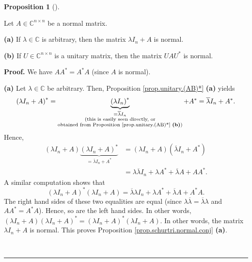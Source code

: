 \documentclass[numbers=enddot,12pt,final,onecolumn,notitlepage]{scrartcl}%
\numberwithin{exer}{subsection}
\theoremstyle{definition}
\newtheorem{prop}[theo]{Proposition}
\newenvironment{proposition}[1][]
{\begin{prop}[#1]\begin{leftbar}}
{\end{leftbar}\end{prop}}
\newenvironment{proof}[1][Proof]{\noindent\textbf{#1.} }{\ \rule{0.5em}{0.5em}}
\begin{document}
\begin{proposition}
\label{prop.schurtri.normal.conj}Let $A\in\mathbb{C}^{n\times n}$ be a normal matrix.

\textbf{(a)} If $\lambda\in\mathbb{C}$ is arbitrary, then the matrix $\lambda
I_{n}+A$ is normal.

\textbf{(b)} If $U\in\mathbb{C}^{n\times n}$ is a unitary matrix, then the
matrix $UAU^{\ast}$ is normal.
\end{proposition}

\begin{proof}
We have $AA^{\ast}=A^{\ast}A$ (since $A$ is normal).

\textbf{(a)} Let $\lambda\in\mathbb{C}$ be arbitrary. Then, Proposition
\ref{prop.unitary.(AB)*} \textbf{(a)} yields%
\[
\left(  \lambda I_{n}+A\right)  ^{\ast}=\underbrace{\left(  \lambda
I_{n}\right)  ^{\ast}}_{\substack{=\overline{\lambda}I_{n}\\\text{(this is
easily seen directly, or}\\\text{obtained from Proposition
\ref{prop.unitary.(AB)*} \textbf{(b)})}}}+A^{\ast}=\overline{\lambda}%
I_{n}+A^{\ast}.
\]
Hence,
\begin{align*}
\left(  \lambda I_{n}+A\right)  \underbrace{\left(  \lambda I_{n}+A\right)
^{\ast}}_{=\overline{\lambda}I_{n}+A^{\ast}}  &  =\left(  \lambda
I_{n}+A\right)  \left(  \overline{\lambda}I_{n}+A^{\ast}\right) \\
&  =\lambda\overline{\lambda}I_{n}+\lambda A^{\ast}+\overline{\lambda
}A+AA^{\ast}.
\end{align*}
A similar computation shows that%
\[
\left(  \lambda I_{n}+A\right)  ^{\ast}\left(  \lambda I_{n}+A\right)
=\overline{\lambda}\lambda I_{n}+\lambda A^{\ast}+\overline{\lambda}A+A^{\ast
}A.
\]
The right hand sides of these two equalities are equal (since $\lambda
\overline{\lambda}=\overline{\lambda}\lambda$ and $AA^{\ast}=A^{\ast}A$).
Hence, so are the left hand sides. In other words, $\left(  \lambda
I_{n}+A\right)  \left(  \lambda I_{n}+A\right)  ^{\ast}=\left(  \lambda
I_{n}+A\right)  ^{\ast}\left(  \lambda I_{n}+A\right)  $. In other words, the
matrix $\lambda I_{n}+A$ is normal. This proves Proposition
\ref{prop.schurtri.normal.conj} \textbf{(a)}.


\end{proof}
\end{document}
